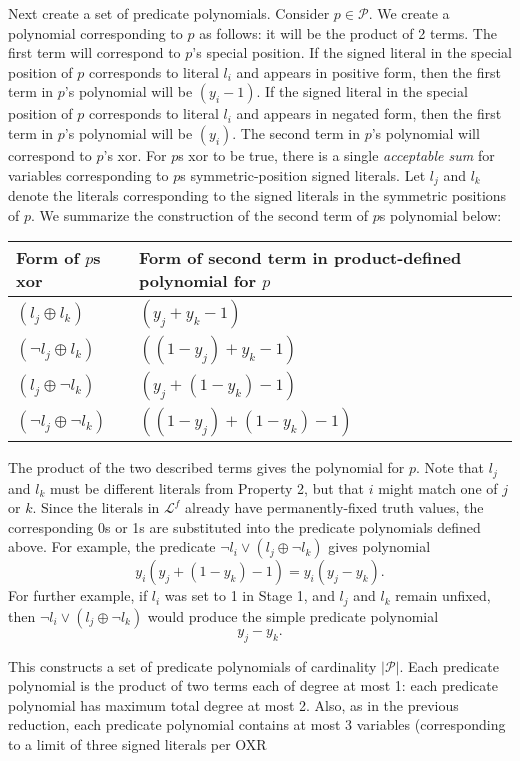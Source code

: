 \documentclass{article}
\begin{document}
Next create a set of predicate polynomials. Consider $p\in\mathcal{P}$.
We create a polynomial corresponding to $p$ as follows: it will be the product of 2 terms.  The first term will correspond to $p$'s special position. If the signed literal in the special position of $p$ corresponds to literal $l_i$ and appears in positive form, then the first term in $p$'s polynomial will be $(y_i-1)$. If the signed literal in the special position of $p$ corresponds to literal $l_i$ and appears in negated form, then the first term in $p$'s polynomial will be $(y_i)$. The second term in $p$'s polynomial will correspond to $p$'s xor.  For $p$s xor to be true, there is a single \textit{acceptable sum} for variables corresponding to $p$s symmetric-position signed literals. Let $l_j$ and $l_k$ denote the literals corresponding to the signed literals in the symmetric positions of $p$.  We summarize the construction of the second term of $p$s polynomial below:\\
\begin{tabular}{l|l}
Form of $p$s xor & Form of second term in product-defined polynomial for $p$\\ \hline
$(l_j\oplus l_k)$ & $(y_j+y_k-1)$ \\
$(\neg l_j\oplus l_k)$ & $((1-y_j)+y_k-1)$ \\
$(l_j\oplus \neg l_k)$ & $(y_j+(1-y_k)-1)$ \\
$(\neg l_j\oplus \neg l_k)$ & $((1-y_j)+(1-y_k)-1)$\\
\end{tabular}

\vspace{4mm}
The product of the two described terms gives the polynomial for $p$. Note that $l_j$ and $l_k$ must be different literals from Property 2, but that $i$ might match one of $j$ or $k$.  Since the literals in $\mathcal{L}^f$ already have permanently-fixed truth values, the corresponding 0s or 1s are substituted into the predicate polynomials defined above.  
For example, the predicate $\neg l_i \vee (l_j\oplus \neg l_k)$ gives polynomial 
\[
y_i(y_j+(1-y_k)-1)= y_i(y_j-y_k).
\]
For further example, if $l_i$ was set to 1 in Stage 1, and $l_j$ and $l_k$ remain unfixed, then $\neg l_i \vee (l_j\oplus \neg l_k)$ would produce the simple predicate polynomial
\[
y_j-y_k.
\]

This constructs a set of predicate polynomials of cardinality $|\mathcal{P}|$.
Each predicate polynomial is the product of two terms each of degree at most 1: each predicate polynomial has maximum total degree at most 2. Also, as in the previous reduction, each predicate polynomial contains at most 3 variables (corresponding to a limit of three signed literals per OXR
\end{document}
